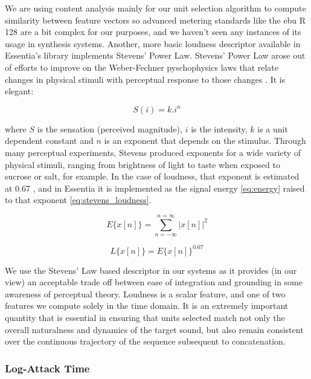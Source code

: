 {{We are using content analysis mainly for our unit selection algorithm to compute similarity between feature vectors so advanced metering standards like the \acrshort{ebu} R 128 are a bit complex for our purposes, and we haven't seen any instances of its usage in synthesis systems. Another, more basic loudness descriptor available in Essentia's library implements Stevens' Power Law. Stevens' Power Law arose out of efforts to improve on the Weber-Fechner pyschophysics laws that relate changes in physical stimuli with perceptual response to those changes \citep{Stevens1975, Reiss2001}. It is elegant:

\begin{equation}
\label{eq:stevens}
S(i)=k.i^{n}
\end{equation}

where $S$ is the sensation (perceived magnitude), $i$ is the intensity, $k$ is a unit dependent constant and $n$ is an exponent that depends on the stimulus. Through many perceptual experiments, Stevens produced exponents for a wide variety of physical stimuli, ranging from brightness of light to taste when exposed to sucrose or salt, for example. In the case of loudness, that exponent is estimated at 0.67 \citep{Stevens1975}, and in Essentia it is implemented as the signal energy \eqref{eq:energy} raised to that exponent \eqref{eq:stevens_loudness}.

\begin{equation}
\label{eq:energy}
E\{x[n]\}= \sum_{n=-\infty}^{n=\infty}|x[n]|^{2}
\end{equation}

\begin{equation}
\label{eq:stevens_loudness}
L\{x[n]\}= E\{x[n]\}^{0.67}
\end{equation}

We use the Stevens' Law based descriptor in our systems as it provides (in our view) an acceptable trade off between ease of integration and grounding in some awareness of perceptual theory. Loudness is a scalar feature, and one of two features we compute solely in the time domain. It is an extremely important quantity that is essential in ensuring that units selected match not only the overall naturalness and dynamics of the target sound, but also remain consistent over the continuous trajectory of the sequence subsequent to concatenation. 

\subsubsection{Log-Attack Time}

}}
